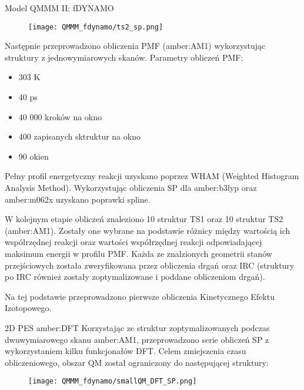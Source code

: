 \begin{section}{Model QMMM II: fDYNAMO}
 \begin{figure}[H]
  \texttt{[image: QMMM\_fdynamo/ts2\_sp.png]}
\end{figure}

Następnie przeprowadzono obliczenia PMF (amber:AM1) wykorzystując struktury z jednowymiarowych skanów. Parametry obliczeń PMF:
\begin{itemize}
 \item 303 K
 \item 40 ps 
 \item 40 000 kroków na okno
 \item 400 zapisanych sktruktur na okno
 \item 90 okien
\end{itemize}

Pełny profil energetyczny reakcji uzyskano poprzez WHAM (Weighted Histogram Analysis Method). Wykorzystując obliczenia SP dla amber:b3lyp oraz amber:m062x uzyskano poprawki spline.

W kolejnym etapie obliczeń znaleziono 10 struktur TS1 oraz 10 struktur TS2 (amber:AM1). Zostały one wybrane na podstawie różnicy między wartością ich współrzędnej reakcji oraz wartości współrzędnej reakcji
odpowiadającej maksimum energii w profilu PMF. Każda ze znalzionych geometrii stanów przejściowych została zweryfikowana przez obliczenia drgań oraz IRC (struktury po IRC również zostały zoptymalizowane
i poddane obliczeniom drgań).

Na tej podstawie przeprowadzono pierwsze obliczenia Kinetycznego Efektu Izotopowego.

\begin{subsection}{2D PES amber:DFT}
Korzystając ze struktur zoptymalizowanych podczas dwuwymiarowego skanu amber:AM1, przeprowadzono serie obliczeń SP z wykorzystaniem kilku funkcjonałów DFT.
Celem zmiejszenia czasu obliczeniowego, obszar QM został ograniczony do następującej struktury:

 \begin{figure}[H]
  \texttt{[image: QMMM\_fdynamo/smallQM\_DFT\_SP.png]}
\end{figure}
 
\end{subsection}


\end{section}
